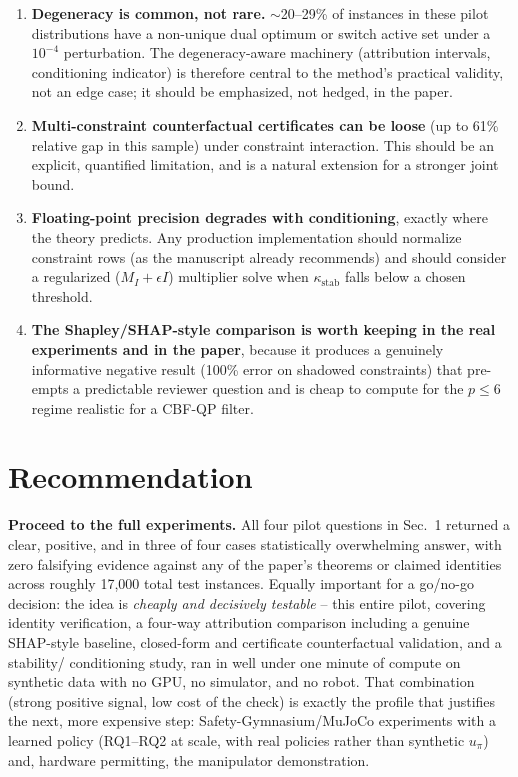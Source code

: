 \documentclass[11pt]{article}
\begin{document}
\begin{enumerate}[leftmargin=1.6em]
  \item \textbf{Degeneracy is common, not rare.} $\sim$20--29\% of instances
        in these pilot distributions have a non-unique dual optimum or switch
        active set under a $10^{-4}$ perturbation. The degeneracy-aware
        machinery (attribution intervals, conditioning indicator) is
        therefore central to the method's practical validity, not an edge
        case; it should be emphasized, not hedged, in the paper.
  \item \textbf{Multi-constraint counterfactual certificates can be loose}
        (up to 61\% relative gap in this sample) under constraint
        interaction. This should be an explicit, quantified limitation, and
        is a natural extension for a stronger joint bound.
  \item \textbf{Floating-point precision degrades with conditioning}, exactly
        where the theory predicts. Any production implementation should
        normalize constraint rows (as the manuscript already recommends) and
        should consider a regularized ($M_I+\epsilon I$) multiplier solve
        when $\kappa_{\mathrm{stab}}$ falls below a chosen threshold.
  \item \textbf{The Shapley/SHAP-style comparison is worth keeping in the
        real experiments and in the paper}, because it produces a
        genuinely informative negative result (100\% error on shadowed
        constraints) that pre-empts a predictable reviewer question and is
        cheap to compute for the $p\le 6$ regime realistic for a CBF-QP
        filter.
\end{enumerate}

\section{Recommendation}

\textbf{Proceed to the full experiments.} All four pilot questions in
Sec.~1 returned a clear, positive, and in three of four cases statistically
overwhelming answer, with zero falsifying evidence against any of the paper's
theorems or claimed identities across roughly 17{,}000 total test instances.
Equally important for a go/no-go decision: the idea is \emph{cheaply and
decisively testable} -- this entire pilot, covering identity verification,
a four-way attribution comparison including a genuine SHAP-style baseline,
closed-form and certificate counterfactual validation, and a stability/
conditioning study, ran in well under one minute of compute on synthetic
data with no GPU, no simulator, and no robot. That combination (strong
positive signal, low cost of the check) is exactly the profile that justifies
the next, more expensive step: Safety-Gymnasium/MuJoCo experiments with a
learned policy (RQ1--RQ2 at scale, with real policies rather than synthetic
$u_\pi$) and, hardware permitting, the manipulator demonstration.
\end{document}
